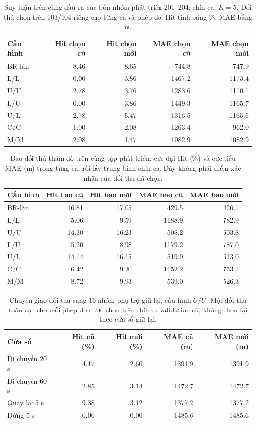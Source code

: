 \begin{table}[htbp]
\centering\small
\caption{Suy luận trên cùng đầu ra của bốn nhóm phát triển 201--204; chín ca, $K=5$. Đối thủ chọn trên 103/104 riêng cho từng ca và phép đo. Hit tính bằng \%, MAE bằng m.}
\label{tab:expanded-shadow-selected}
\begin{tabular}{lrrrr}
\toprule
Cấu hình & Hit chọn cũ & Hit chọn mới & MAE chọn cũ & MAE chọn mới\\
\midrule
BR-làn & 8.46 & 8.65 & 744.8 & 747.9 \\
L/L & 0.00 & 3.86 & 1467.2 & 1173.4 \\
U/U & 2.78 & 3.76 & 1283.6 & 1110.1 \\
L/U & 0.00 & 3.86 & 1449.3 & 1165.7 \\
U/L & 2.78 & 5.47 & 1316.5 & 1165.5 \\
C/C & 1.00 & 2.08 & 1263.4 & 962.0 \\
M/M & 2.08 & 1.47 & 1082.9 & 1082.9 \\
\bottomrule
\end{tabular}
\end{table}
\begin{table}[htbp]
\centering\small
\caption{Bao đối thủ thăm dò trên cùng tập phát triển: cực đại Hit (\%) và cực tiểu MAE (m) trong từng ca, rồi lấy trung bình chín ca. Đây không phải điểm xác nhận của đối thủ đã chọn.}
\label{tab:expanded-shadow-envelope}
\begin{tabular}{lrrrr}
\toprule
Cấu hình & Hit bao cũ & Hit bao mới & MAE bao cũ & MAE bao mới\\
\midrule
BR-làn & 16.81 & 17.05 & 429.5 & 426.1 \\
L/L & 5.06 & 9.59 & 1188.9 & 782.9 \\
U/U & 14.30 & 16.23 & 508.2 & 503.8 \\
L/U & 5.20 & 8.98 & 1179.2 & 787.0 \\
U/L & 14.14 & 16.15 & 519.9 & 513.0 \\
C/C & 6.42 & 9.20 & 1152.2 & 753.1 \\
M/M & 8.72 & 9.93 & 539.0 & 526.3 \\
\bottomrule
\end{tabular}
\end{table}
\begin{table}[htbp]
\centering\small
\caption{Chuyển giao đối thủ sang 16 nhóm phụ trợ giữ lại, cấu hình $U/U$. Một đối thủ toàn cục cho mỗi phép đo được chọn trên chín ca validation cũ, không chọn lại theo cửa sổ giữ lại.}
\label{tab:expanded-shadow-holdout}
\begin{tabular}{lrrrr}
\toprule
Cửa sổ & Hit cũ (\%) & Hit mới (\%) & MAE cũ (m) & MAE mới (m)\\
\midrule
Di chuyển 20 s & 4.17 & 2.60 & 1391.9 & 1391.9 \\
Di chuyển 60 s & 2.85 & 3.14 & 1472.7 & 1472.7 \\
Quay lại 5 s & 9.38 & 3.12 & 1377.2 & 1377.2 \\
Dừng 5 s & 0.00 & 0.00 & 1485.6 & 1485.6 \\
\bottomrule
\end{tabular}
\end{table}
